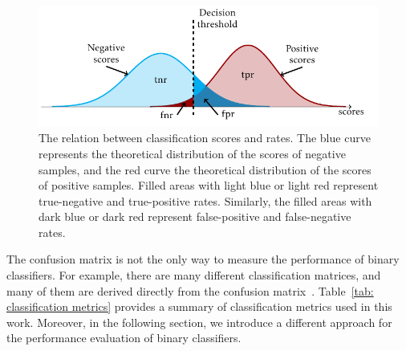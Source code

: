 \begin{figure}
  \centering
  \includegraphics{images/confusion_rates.pdf}
  \caption{The relation between classification scores and  rates. The blue curve represents the theoretical distribution of the scores of negative samples, and the red curve the theoretical distribution of the scores of positive samples. Filled areas with light blue or light red represent true-negative and true-positive rates. Similarly, the filled areas with dark blue or dark red represent false-positive and false-negative rates.}
  \label{fig: scores and rates}
\end{figure}

The confusion matrix is not the only way to measure the performance of binary classifiers. For example, there are many different classification matrices, and many of them are derived directly from the confusion matrix~\cite{fawcett2006introduction, metz1978basic, brodersen2010balanced, hossin2015review}. Table~\ref{tab: classification metrics} provides a summary of classification metrics used in this work. Moreover, in the following section, we introduce a different approach for the performance evaluation of binary classifiers.


